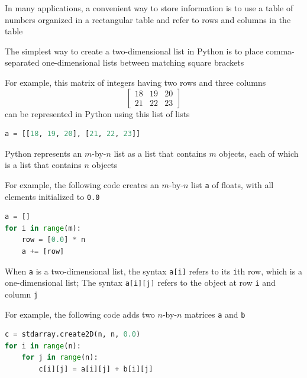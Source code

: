 \documentclass[8pt,a4paper,compress]{beamer}
\begin{document}
\begin{frame}[fragile]
\pause

In many applications, a convenient way to store information is to use a table of numbers organized in a rectangular table and refer to rows and columns in the table

\pause
\bigskip

The simplest way to create a two-dimensional list in Python is to place comma-separated one-dimensional lists between matching square brackets 

\pause
\bigskip

For example, this matrix of integers having two rows and three columns 
\[
\begin{bmatrix}
18 & 19 & 20 \\ 
21 & 22 & 23
\end{bmatrix}
\]
can be represented in Python using this list of lists
\begin{lstlisting}[language=Python]
a = [[18, 19, 20], [21, 22, 23]]
\end{lstlisting}

\pause
\bigskip

Python represents an $m$-by-$n$ list as a list that contains $m$ objects, each of which is a list that contains $n$ objects

\pause
\bigskip

For example, the following code creates an $m$-by-$n$ list \lstinline{a} of floats, with all elements initialized to \lstinline{0.0}
\begin{lstlisting}[language=Python]
a = []
for i in range(m):
    row = [0.0] * n
    a += [row]
\end{lstlisting}
\end{frame}

\begin{frame}[fragile]
\pause

When \lstinline{a} is a two-dimensional list, the syntax \lstinline{a[i]} refers to its \lstinline{i}th row, which is a one-dimensional list; The syntax \lstinline{a[i][j]} refers to the object at row \lstinline{i} and column \lstinline{j}

\pause
\bigskip

For example, the following code adds two $n$-by-$n$ matrices \lstinline{a} and \lstinline{b}

\begin{lstlisting}[language=Python]
c = stdarray.create2D(n, n, 0.0)
for i in range(n):
    for j in range(n):
        c[i][j] = a[i][j] + b[i][j]
\end{lstlisting}
\end{frame}
\end{document}
